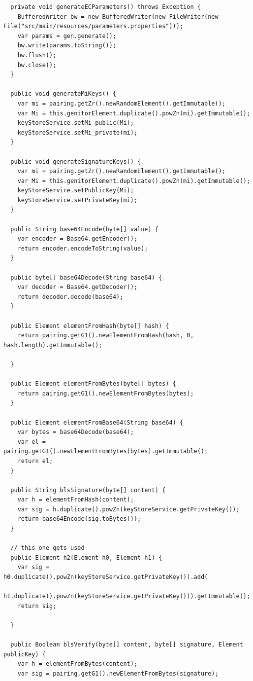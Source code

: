 \documentclass[12pt,a4paper]{report}
\begin{document}
\begin{verbatim}
  private void generateECParameters() throws Exception {
    BufferedWriter bw = new BufferedWriter(new FileWriter(new File("src/main/resources/parameters.properties")));
    var params = gen.generate();
    bw.write(params.toString());
    bw.flush();
    bw.close();
  }

  public void generateMiKeys() {
    var mi = pairing.getZr().newRandomElement().getImmutable();
    var Mi = this.genitorElement.duplicate().powZn(mi).getImmutable();
    keyStoreService.setMi_public(Mi);
    keyStoreService.setMi_private(mi);
  }

  public void generateSignatureKeys() {
    var mi = pairing.getZr().newRandomElement().getImmutable();
    var Mi = this.genitorElement.duplicate().powZn(mi).getImmutable();
    keyStoreService.setPublicKey(Mi);
    keyStoreService.setPrivateKey(mi);
  }

  public String base64Encode(byte[] value) {
    var encoder = Base64.getEncoder();
    return encoder.encodeToString(value);
  }

  public byte[] base64Decode(String base64) {
    var decoder = Base64.getDecoder();
    return decoder.decode(base64);
  }

  public Element elementFromHash(byte[] hash) {
    return pairing.getG1().newElementFromHash(hash, 0, hash.length).getImmutable();

  }

  public Element elementFromBytes(byte[] bytes) {
    return pairing.getG1().newElementFromBytes(bytes);
  }

  public Element elementFromBase64(String base64) {
    var bytes = base64Decode(base64);
    var el = pairing.getG1().newElementFromBytes(bytes).getImmutable();
    return el;
  }

  public String blsSignature(byte[] content) {
    var h = elementFromHash(content);
    var sig = h.duplicate().powZn(keyStoreService.getPrivateKey());
    return base64Encode(sig.toBytes());
  }

  // this one gets used
  public Element h2(Element h0, Element h1) {
    var sig = h0.duplicate().powZn(keyStoreService.getPrivateKey()).add(
        h1.duplicate().powZn(keyStoreService.getPrivateKey())).getImmutable();
    return sig;

  }

  public Boolean blsVerify(byte[] content, byte[] signature, Element publicKey) {
    var h = elementFromBytes(content);
    var sig = pairing.getG1().newElementFromBytes(signature);


\end{verbatim}
\end{document}
